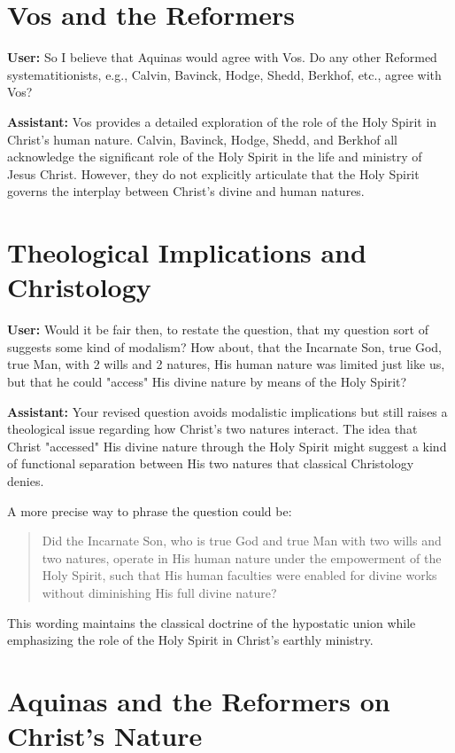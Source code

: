 \documentclass{article}
\begin{document}
\section{Vos and the Reformers}

\textbf{User:} So I believe that Aquinas would agree with Vos. Do any other Reformed systematitionists, e.g., Calvin, Bavinck, Hodge, Shedd, Berkhof, etc., agree with Vos?

\textbf{Assistant:} Vos provides a detailed exploration of the role of the Holy Spirit in Christ's human nature. Calvin, Bavinck, Hodge, Shedd, and Berkhof all acknowledge the significant role of the Holy Spirit in the life and ministry of Jesus Christ. However, they do not explicitly articulate that the Holy Spirit governs the interplay between Christ's divine and human natures.

\section{Theological Implications and Christology}

\textbf{User:} Would it be fair then, to restate the question, that my question sort of suggests some kind of modalism? How about, that the Incarnate Son, true God, true Man, with 2 wills and 2 natures, His human nature was limited just like us, but that he could "access" His divine nature by means of the Holy Spirit?

\textbf{Assistant:} Your revised question avoids modalistic implications but still raises a theological issue regarding how Christ's two natures interact. The idea that Christ "accessed" His divine nature through the Holy Spirit might suggest a kind of functional separation between His two natures that classical Christology denies.

A more precise way to phrase the question could be:

\begin{quote}
Did the Incarnate Son, who is true God and true Man with two wills and two natures, operate in His human nature under the empowerment of the Holy Spirit, such that His human faculties were enabled for divine works without diminishing His full divine nature?
\end{quote}

This wording maintains the classical doctrine of the hypostatic union while emphasizing the role of the Holy Spirit in Christ’s earthly ministry.

\section{Aquinas and the Reformers on Christ's Nature}
\end{document}
